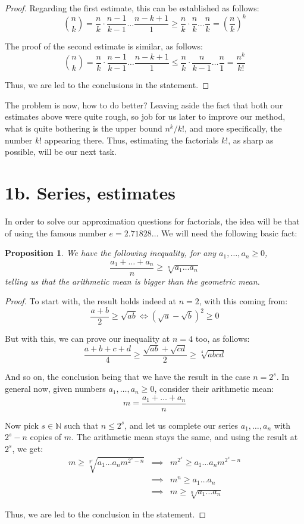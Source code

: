 \documentclass[12pt]{amsbook}
\newtheorem{proposition}[theorem]{Proposition}
\begin{document}
\begin{proof}
Regarding the first estimate, this can be established as follows:
$$\binom{n}{k}
=\frac{n}{k}\cdot\frac{n-1}{k-1}\ldots\frac{n-k+1}{1}
\geq\frac{n}{k}\cdot\frac{n}{k}\ldots\frac{n}{k}
=\left(\frac{n}{k}\right)^k$$

The proof of the second estimate is similar, as follows:
$$\binom{n}{k}
=\frac{n}{k}\cdot\frac{n-1}{k-1}\ldots\frac{n-k+1}{1}
\leq\frac{n}{k}\cdot\frac{n}{k-1}\ldots\frac{n}{1}
=\frac{n^k}{k!}$$

Thus, we are led to the conclusions in the statement.
\end{proof}

The problem is now, how to do better? Leaving aside the fact that both our estimates above were quite rough, so job for us later to improve our method, what is quite bothering is the upper bound $n^k/k!$, and more specifically, the number $k!$ appearing there. Thus, estimating the factorials $k!$, as sharp as possible, will be our next task.

\section*{1b. Series, estimates}

In order to solve our approximation questions for factorials, the idea will be that of using the famous number $e=2.71828\ldots$ We will need the following basic fact:

\begin{proposition}
We have the following inequality, for any $a_1,\ldots,a_n\geq0$,
$$\frac{a_1+\ldots+a_n}{n}\geq\sqrt[n]{a_1\ldots a_n}$$
telling us that the arithmetic mean is bigger than the geometric mean.
\end{proposition}

\begin{proof}
To start with, the result holds indeed at $n=2$, with this coming from:
$$\frac{a+b}{2}\geq\sqrt{ab}\iff(\sqrt{a}-\sqrt{b})^2\geq0$$

But with this, we can prove our inequality at $n=4$ too, as follows:
$$\frac{a+b+c+d}{4}
\geq\frac{\sqrt{ab}+\sqrt{cd}}{2}
\geq\sqrt[4]{abcd}$$

And so on, the conclusion being that we have the result in the case $n=2^s$. In general now, given numbers $a_1,\ldots,a_n\geq0$, consider their arithmetic mean:
$$m=\frac{a_1+\ldots+a_n}{n}$$

Now pick $s\in\mathbb N$ such that $n\leq 2^s$, and let us complete our series $a_1,\ldots,a_n$ with $2^s-n$ copies of $m$. The arithmetic mean stays the same, and using the result at $2^s$, we get:
\begin{eqnarray*}
m\geq\sqrt[2^s]{a_1\ldots a_nm^{2^s-n}}
&\implies&m^{2^s}\geq a_1\ldots a_nm^{2^s-n}\\
&\implies&m^n\geq a_1\ldots a_n\\
&\implies&m\geq\sqrt[n]{a_1\ldots a_n}
\end{eqnarray*}

Thus, we are led to the conclusion in the statement. 
\end{proof}
\end{document}
